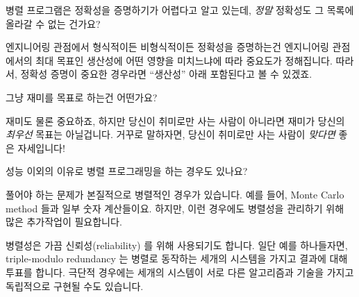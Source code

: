\QuickQ{}
	병렬 프로그램은 정확성을 증명하기가 어렵다고 알고 있는데, \emph{정말}
	정확성도 그 목록에 올라갈 수 없는 건가요?

\QuickA{}
	엔지니어링 관점에서 형식적이든 비형식적이든 정확성을 증명하는건
	엔지니어링 관점에서의 최대 목표인 생산성에 어떤 영향을 미치느냐에 따라
	중요도가 정해집니다.
	따라서, 정확성 증명이 중요한 경우라면 ``생산성'' 아래 포함된다고 볼 수
	있겠죠.

\QuickQ{}
	그냥 재미를 목표로 하는건 어떤가요?

\QuickA{}
	재미도 물론 중요하죠, 하지만 당신이 취미로만 사는 사람이 아니라면
	재미가 당신의 \emph{최우선} 목표는 아닐겁니다.  거꾸로 말하자면, 당신이
	취미로만 사는 사람이 \emph{맞다면} 좋은 자세입니다!

\QuickQ{}
	성능 이외의 이유로 병렬 프로그래밍을 하는 경우도 있나요?

\QuickA{}
	풀어야 하는 문제가 본질적으로 병렬적인 경우가 있습니다. 예를 들어,
	Monte Carlo method 들과 일부 숫자 계산들이요.
	하지만, 이런 경우에도 병렬성을 관리하기 위해 많은 추가작업이
	필요합니다.

	병렬성은 가끔 신뢰성(reliability) 를 위해 사용되기도 합니다.
	일단 예를 하나들자면, triple-modulo redundancy 는 병렬로 동작하는
	세개의 시스템을 가지고 결과에 대해 투표를 합니다.
	극단적 경우에는 세개의 시스템이 서로 다른 알고리즘과 기술을 가지고
	독립적으로 구현될 수도 있습니다.

